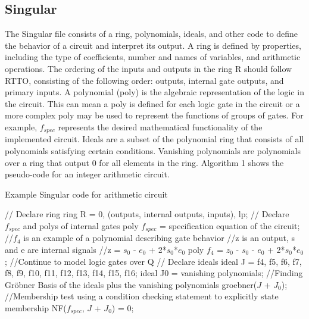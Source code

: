 \documentclass[conference]{IEEEtran}
\begin{document}
\subsection{Singular}
The Singular file consists of a ring, polynomials, ideals, and other code to define the behavior of a circuit and interpret its output. A ring is defined by properties, 
including the type of coefficients, number and names of variables, and arithmetic operations. The ordering of the inputs and outputs in 
the ring R should follow RTTO, consisting of the following order: outputs, internal gate outputs, and primary inputs. A polynomial (poly) is the algebraic representation of the logic in the circuit.
This can mean a poly is defined for each logic gate in the circuit or a more complex poly may be used to represent the functions of groups of gates. 
For example, $f_{spec}$ represents the desired mathematical functionality of the implemented circuit. Ideals are a subset of the polynomial ring 
that consists of all polynomials satisfying certain conditions. Vanishing polynomials are polynomials over a ring that output 0 for all elements in the ring.
Algorithm 1 shows the pseudo-code for an integer arithmetic circuit.
\begin{algorithm}
    \caption{Example Singular code for arithmetic circuit}
    \begin{algorithmic}
        \STATE // Declare ring
        \STATE ring R = 0, (outputs, internal outputs, inputs), lp;
        \STATE
        \STATE // Declare $f_{spec}$ and polys of internal gates
        \STATE poly $f_{spec}$ = specification equation of the circuit;
        \STATE //$f_{4}$ is an example of a polynomial describing gate behavior
        \STATE //z is an output, s and e are internal signals
        \STATE //z = $s_{0}$ - $e_{0}$ + 2*$s_{0}$*$e_{0}$
        \STATE poly $f_{4}$ = $z_{0}$ - $s_{0}$ - $e_{0}$ + 2*$s_{0}$*$e_{0}$; 
        \STATE //Continue to model logic gates over Q
        \STATE
        \STATE // Declare ideals
        \STATE ideal J = f4, f5,  f6, f7, f8, f9, f10, f11, f12, f13, f14, f15, f16;
        \STATE ideal J0 = vanishing polynomials;
        \STATE
        \STATE //Finding Gröbner Basis of the ideals plus the vanishing polynomials
        \STATE groebner($J$ + $J_{0}$);
        \STATE
        \STATE //Membership test using a condition checking statement to explicitly state membership
        \STATE NF($f_{spec}$, $J$ + $J_{0}$) = 0;
    \end{algorithmic}
\end{algorithm}
\end{document}
